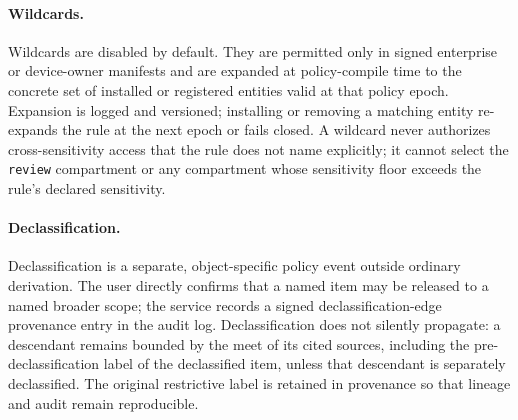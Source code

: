 \paragraph{Wildcards.} Wildcards are disabled by default. They are permitted only in signed enterprise or device-owner manifests and are expanded at policy-compile time to the concrete set of installed or registered entities valid at that policy epoch. Expansion is logged and versioned; installing or removing a matching entity re-expands the rule at the next epoch or fails closed. A wildcard never authorizes cross-sensitivity access that the rule does not name explicitly; it cannot select the \texttt{review} compartment or any compartment whose sensitivity floor exceeds the rule's declared sensitivity.

\paragraph{Declassification.} Declassification is a separate, object-specific policy event outside ordinary derivation. The user directly confirms that a named item may be released to a named broader scope; the service records a signed declassification-edge provenance entry in the audit log. Declassification does not silently propagate: a descendant remains bounded by the meet of its cited sources, including the pre-declassification label of the declassified item, unless that descendant is separately declassified. The original restrictive label is retained in provenance so that lineage and audit remain reproducible.
